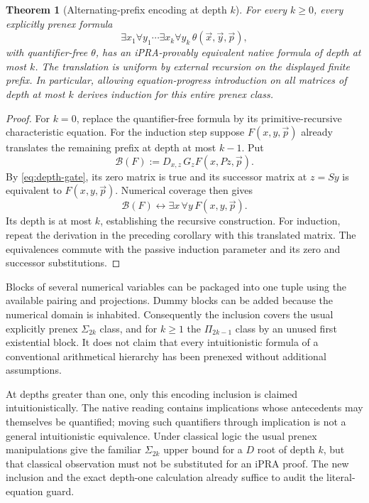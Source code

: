 \documentclass[11pt]{article}
\newtheorem{theorem}{Theorem}[section]
\theoremstyle{definition}\newtheorem{definition}[theorem]{Definition}
\begin{document}
\begin{theorem}[Alternating-prefix encoding at depth $k$]
For every $k\geq0$, every explicitly prenex formula
\[
 \exists x_1\forall y_1\cdots\exists x_k\forall y_k\,
 \theta(\vec x,\vec y,\vec p),
\]
with quantifier-free $\theta$, has an iPRA-provably equivalent native
formula of depth at most $k$. The translation is uniform by external
recursion on the displayed finite prefix. In particular, allowing
equation-progress introduction on all matrices of depth at most $k$
derives induction for this entire prenex class.
\end{theorem}

\begin{proof}
For $k=0$, replace the quantifier-free formula by its primitive-recursive
characteristic equation. For the induction step suppose $F(x,y,\vec p)$
already translates the remaining prefix at depth at most $k-1$. Put
\[
             \mathcal B(F)
       :=D_{x,z}\,G_zF(x,Pz,\vec p).
\]
By \eqref{eq:depth-gate}, its zero matrix is true and its successor
matrix at $z=Sy$ is equivalent to $F(x,y,\vec p)$. Numerical coverage
then gives
\[
             \mathcal B(F)
       \leftrightarrow\exists x\,\forall y\,F(x,y,\vec p).
\]
Its depth is at most $k$, establishing the recursive construction.
For induction, repeat the derivation in the preceding corollary with
this translated matrix. The equivalences commute with the passive
induction parameter and its zero and successor substitutions.
\end{proof}

Blocks of several numerical variables can be packaged into one tuple
using the available pairing and projections. Dummy blocks can be added
because the numerical domain is inhabited. Consequently the inclusion
covers the usual explicitly prenex $\Sigma_{2k}$ class, and for $k\ge1$ the
$\Pi_{2k-1}$ class by an unused first existential block. It does not
claim that every intuitionistic formula of a conventional arithmetical
hierarchy has been prenexed without additional assumptions.

At depths greater than one, only this encoding inclusion is claimed
intuitionistically. The native reading contains implications whose
antecedents may themselves be quantified; moving such quantifiers
through implication is not a general intuitionistic equivalence.
Under classical logic the usual prenex manipulations give the familiar
$\Sigma_{2k}$ upper bound for a $D$ root of depth $k$, but that classical
observation must not be substituted for an iPRA proof. The new inclusion
and the exact depth-one calculation already suffice to audit the
literal-equation guard.
\end{document}
